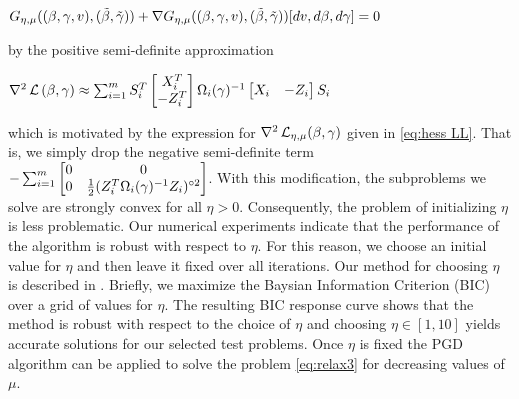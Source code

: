  \centerline{$
 G_{\eta,\mu}((\beta, \gamma, v), (\tilde\beta, \tilde\gamma))+
 \nabla G_{\eta,\mu}((\beta, \gamma, v), (\tilde\beta, \tilde\gamma))
 [dv, d\beta, d\gamma] =0
$}

\noindent
by the positive semi-definite approximation 

 \centerline{$
\nabla^2\operatorname{\mathcal{L}}{(\beta,\gamma)} \approx \sum_{i=1}^m
S_i^T\begin{bmatrix}X_i^T\\ -Z_i^T\end{bmatrix}
\Omega_i(\gamma)^{-1}
\begin{bmatrix}X_i& -Z_i\end{bmatrix}S_i
$}

\noindent
which is motivated by the expression for $\nabla^2\operatorname{\mathcal{L}}_{{\eta,\mu}}(\beta,\gamma)$ given in
\eqref{eq:hess LL}. That is, we simply drop the negative semi-definite term
$-\sum_{i=1}^m\begin{bmatrix}
0&0\\ 0& \frac{1}{2}(Z_i^T\Omega_i(\gamma)^{-1}Z_i)^{\circ2}
\end{bmatrix}$.
With this modification, the subproblems we solve are strongly convex for all $\eta>0$.
Consequently, the problem of initializing $\eta$ is less problematic. Our numerical experiments indicate that the performance of the algorithm is robust with respect to 
$\eta$. For this reason, we choose an initial value for $\eta$ and 
then leave it fixed over all iterations. Our method for choosing $\eta$ is described
in \cite[Section 4, Figure 5]{Practice}. Briefly, we maximize the 
Baysian Information Criterion (BIC) over a grid of values for $\eta$. 
 The resulting BIC response curve shows 
that the method is robust with respect to the 
 choice of $\eta$ and choosing $\eta\in [1,10]$ yields 
 accurate solutions for our selected test problems. 
 Once $\eta$ is fixed the
 PGD algorithm can be applied to solve the problem \eqref{eq:relax3}
 for decreasing values of $\mu$. 
